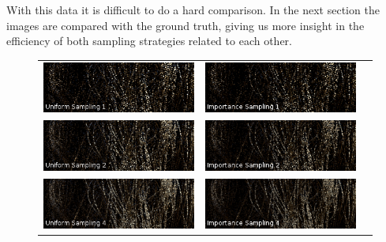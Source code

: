 \documentclass[11pt,a4paper]{report}
\begin{document}
With this data it is difficult to do a hard comparison. In the next section the images are compared with the ground truth, giving us more insight in the efficiency of both sampling strategies related to each other.  


\begin{figure}
\begin{center}
\bgroup
\setlength{\tabcolsep}{0.04em} %
\def\arraystretch{0.2}%
\begin{tabular}{ccc}
\includegraphics[scale=0.57]{variance-results/un1.png} & \includegraphics[scale=0.57]{variance-results/is1.png} \\ \includegraphics[scale=0.57]{variance-results/un2.png} & \includegraphics[scale=0.57]{variance-results/is2.png} \\
\includegraphics[scale=0.57]{variance-results/un4.png} & \includegraphics[scale=0.57]{variance-results/is4.png} \\

\end{tabular}
\end{center}
\end{figure}
\end{document}
